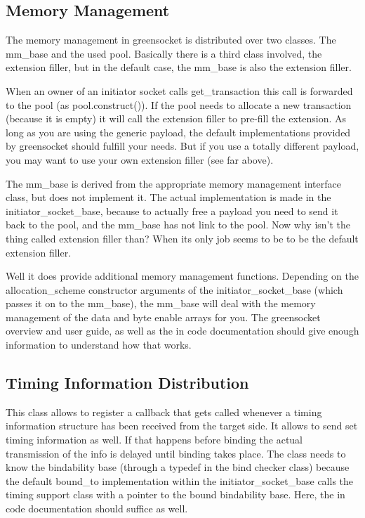 \documentclass[a4paper,10pt]{article}          %
\newcommand{\code}[1]{{\ttfamily#1}}
\begin{document}
\subsection{Memory Management}

The memory management in greensocket is distributed over two classes. The \code{mm\_base} and the used pool. Basically there is a third class involved, the extension filler, but in the default case, the \code{mm\_base} is also the extension filler.

When an owner of an initiator socket calls \code{get\_transaction} this call is forwarded to the pool (as \code{pool.construct()}). If the pool needs to allocate a new transaction (because it is empty) it will call the extension filler to pre-fill the extension. As long as you are using the generic payload, the default implementations provided by greensocket should fulfill your needs. But if you use a totally different payload, you may want to use your own extension filler (see far above).

The \code{mm\_base} is derived from the appropriate memory management interface class, but does not implement it. The actual implementation is made in the \code{initiator\_socket\_base}, because to actually free a payload you need to send it back to the pool, and the \code{mm\_base} has not link to the pool. Now why isn't the thing called extension filler than? When its only job seems to be to be the default extension filler.

Well it does provide additional memory management functions. Depending on the \code{allocation\_scheme} constructor arguments of the \code{initiator\_socket\_base} (which passes it on to the \code{mm\_base}), the \code{mm\_base} will deal with the memory management of the data and byte enable arrays for you. The greensocket overview and user guide, as well as the in code documentation should give enough information to understand how that works.

\subsection{Timing Information Distribution}
This class allows to register a callback that gets called whenever a timing information structure has been received from the target side. It allows to send set timing information as well. If that happens before binding the actual transmission of the info is delayed until binding takes place. The class needs to know the bindability base (through a typedef in the bind checker class) because the default \code{bound\_to} implementation within the \code{initiator\_socket\_base} calls the timing support class with a pointer to the bound bindability base. Here, the in code documentation should suffice as well.
\end{document}
